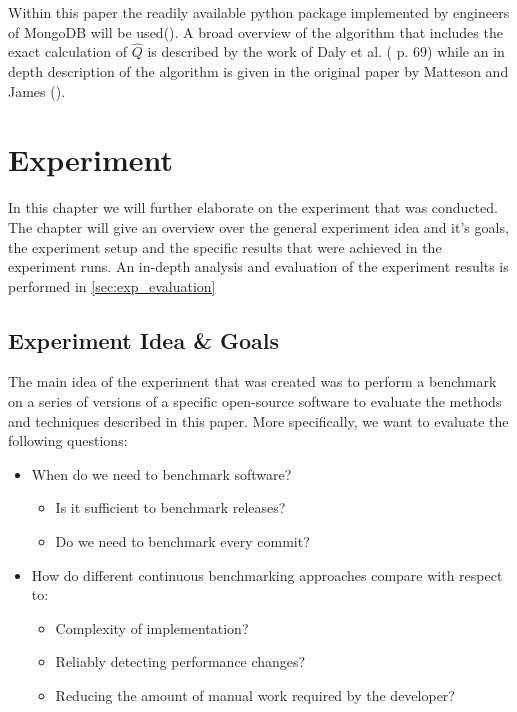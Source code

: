 \documentclass[	runningheads,
				a4paper]{llncs}
\begin{document}
	Within this paper the readily available python package implemented by engineers of MongoDB will be used(\cite{gitmongo}). A broad overview of the algorithm that includes the exact calculation of $\hat{Q}$ is described by the work of Daly et al. (\cite{daly2020} p. 69) while an in depth description of the algorithm is given in the original paper by Matteson and James (\cite{Matteson2013}).

\section{Experiment}
In this chapter we will further elaborate on the experiment that was conducted. The chapter will give an overview over the general experiment idea and it's goals, the experiment setup and the specific results that were achieved in the experiment runs. An in-depth analysis and evaluation of the experiment results is performed in \autoref{sec:exp_evaluation}

	\subsection{Experiment Idea \& Goals}
	\label{ssec:exp_goals}

	The main idea of the experiment that was created was to perform a benchmark on a series of versions of a specific open-source software to evaluate the methods and techniques described in this paper. More specifically, we want to evaluate the following questions:
	\begin{itemize}
		\item When do we need to benchmark software?
			\begin{itemize}
				\item Is it sufficient to benchmark releases?
				\item Do we need to benchmark every commit?
			\end{itemize}
		\item How do different continuous benchmarking approaches compare with respect to:
			\begin{itemize}
				\item Complexity of implementation?
				\item Reliably detecting performance changes?
				\item Reducing the amount of manual work required by the developer?
			\end{itemize}
	\end{itemize}
\end{document}
